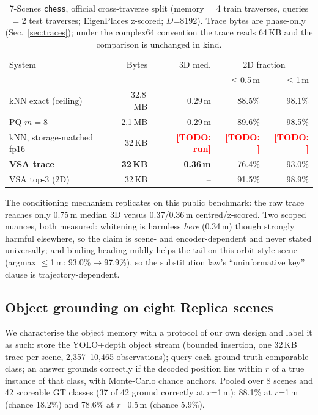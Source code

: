 \documentclass[conference]{IEEEtran}
\newcommand{\todo}[1]{\textcolor{red}{\textbf{[TODO: #1]}}}
\begin{document}
\begin{table}[t]
\caption{7-Scenes \texttt{chess}, official cross-traverse split
(memory = 4 train traverses, queries = 2 test traverses; EigenPlaces
z-scored; $D$=8192). Trace bytes are phase-only
(Sec.~\ref{sec:traces}); under the complex64 convention the trace reads
64\,KB and the comparison is unchanged in kind.}
\label{tab:chess}
\centering
\small
\begin{tabular}{@{}lrrrr@{}}
\toprule
System & Bytes & 3D med. & \multicolumn{2}{c}{2D fraction} \\
 & & & $\le$0.5\,m & $\le$1\,m \\
\midrule
kNN exact (ceiling) & 32.8\,MB & 0.29\,m & 88.5\% & 98.1\% \\
PQ $m{=}8$ & 2.1\,MB & 0.29\,m & 89.6\% & 98.5\% \\
kNN, storage-matched fp16 & 32\,KB & \todo{run} & \todo{} & \todo{} \\
\textbf{VSA trace} & \textbf{32\,KB} & \textbf{0.36\,m} & 76.4\% & 93.0\% \\
VSA top-3 (2D) & 32\,KB & -- & 91.5\% & 98.9\% \\
\bottomrule
\end{tabular}
\end{table}

The conditioning mechanism replicates on this public benchmark: the raw
trace reaches only 0.75\,m median 3D versus 0.37/0.36\,m
centred/z-scored. Two scoped nuances, both measured: whitening is
harmless \emph{here} (0.34\,m) though strongly harmful elsewhere, so the
claim is scene- and encoder-dependent and never stated universally; and
binding heading mildly helps the tail on this orbit-style scene (argmax
$\le$1\,m: 93.0\%$\to$97.9\%), so the substitution law's
``uninformative key'' clause is trajectory-dependent.

\subsection{Object grounding on eight Replica scenes}
\label{sec:grounding}

We characterise the object memory with a protocol of our own design and
label it as such: store the YOLO+depth object stream (bounded insertion,
one 32\,KB trace per scene, 2{,}357--10{,}465 observations); query each
ground-truth-comparable class; an answer grounds correctly if the decoded
position lies within $r$ of a true instance of that class, with
Monte-Carlo chance anchors. Pooled over 8 scenes and 42 scoreable GT
classes (37 of 42 ground correctly at $r$=1\,m): 88.1\% at $r$=1\,m
(chance 18.2\%) and 78.6\% at $r$=0.5\,m (chance 5.9\%).
\end{document}
